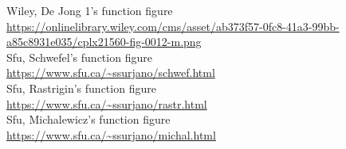 \documentclass{article}
\begin{document}
\begin{thebibliography}{9}

        Wiley, De Jong 1's function figure \\
        \url{https://onlinelibrary.wiley.com/cms/asset/ab373f57-0fc8-41a3-99bb-a85c8931e035/cplx21560-fig-0012-m.png}\\
        Sfu, Schwefel’s function figure \\
        \url{https://www.sfu.ca/~ssurjano/schwef.html}\\
        Sfu, Rastrigin’s function figure \\
        \url{https://www.sfu.ca/~ssurjano/rastr.html}\\
        Sfu, Michalewicz's function figure \\
        \url{https://www.sfu.ca/~ssurjano/michal.html}


\end{thebibliography}
\end{document}
